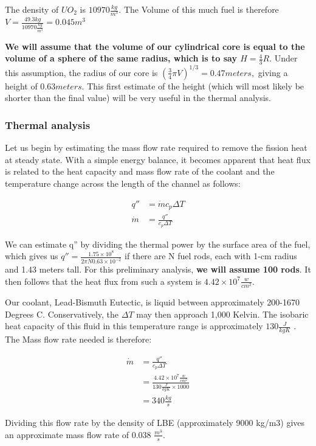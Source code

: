 \documentclass[12pt]{article}
\begin{document}
The density of $UO_2$ is $10970 \frac{kg}{m^3}$. The Volume of this much fuel is therefore $V = \frac{49.3 kg}{10970 \frac{kg}{m^3}} =  0.045 m ^ 3 $

\textbf{We will assume that the volume of our cylindrical core is equal to the volume of a sphere of the same radius, which is to say $H = \frac{4}{3} R$}. Under this assumption, the radius of our core is $(\frac{3}{4} \pi V) ^ {1/3} = 0.47 meters,$ giving a height of $0.63 meters$. This first estimate of the height (which will most likely be shorter than the final value) will be very useful in the thermal analysis.   
\subsubsection{Thermal analysis}
Let us begin by estimating the mass flow rate required to remove the fission heat at steady state. With a simple energy balance, it becomes apparent that heat flux is related to the heat capacity and mass flow rate of the coolant and the temperature change across the length of the channel as follows:

\begin{align}
q'' &= \dot{m} c_p \Delta T \\
\dot{m} &= \frac{q''}{c_p \Delta T}
\end{align}

We can estimate q'' by dividing the thermal power by the surface area of the fuel, which gives us $q'' = \frac{1.75 \times 10^8}{2 \pi N 0.63 \times 10 ^{-2}}$ if there are N fuel rods, each with 1-cm radius and 1.43 meters tall. For this preliminary analysis, \textbf{we will assume 100 rods}. It then follows that the heat flux from such a system is $4.42 \times 10^7 \frac{w}{cm^2}$. 

Our coolant, Lead-Bismuth Eutectic, is liquid between approximately 200-1670 Degrees C. Conservatively, the $\Delta T$ may then approach 1,000 Kelvin. The isobaric heat capacity of this fluid in this temperature range is approximately $130 \frac{J}{kg K}$ \cite{LBE_properties}. The Mass flow rate needed is therefore:

\begin{align}
\dot{m} &= \frac{q''}{c_p \Delta T} \\
 &= \frac{4.42 \times 10^7 \frac{w}{cm^2}}{130 \frac{J}{kg K} \times 1000} \\
 &= 340 \frac{kg}{s}
\end{align} 

Dividing this flow rate by the density of LBE (approximately 9000 kg/m3) gives an approximate mass flow rate of 0.038 $\frac{m^3}{s}$.
\end{document}
